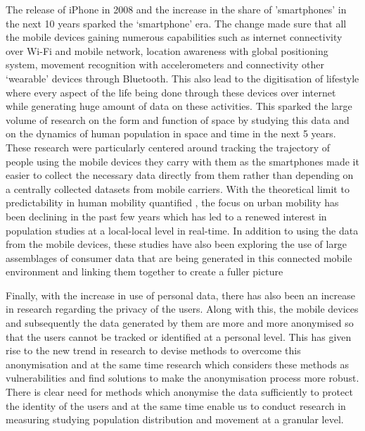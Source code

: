 The release of iPhone in 2008 and the increase in the share of 'smartphones' in the next 10 years sparked the `smartphone' era. 
The change made sure that all the mobile devices gaining numerous capabilities such as internet connectivity over Wi-Fi and mobile network, location awareness with global positioning system, movement recognition with accelerometers and connectivity other `wearable' devices through Bluetooth.
This also lead to the digitisation of lifestyle where every aspect of the life being done through these devices over internet while generating huge amount of data on these activities.
This sparked the large volume of research on the form and function of space by studying this data and on the dynamics of human population in space and time in the next 5 years.
These research were particularly centered around tracking the trajectory of people using the mobile devices they carry with them as the smartphones made it easier to collect the necessary data directly from them rather than depending on a centrally collected datasets from mobile carriers. 
With the theoretical limit to predictability in human mobility quantified \cite{song2010limits}, the focus on urban mobility has been declining in the past few years which has led to a renewed interest in population studies at a local-local level in real-time.
In addition to using the data from the mobile devices, these studies have also been exploring the use of large assemblages of consumer data that are being generated in this connected mobile environment and linking them together to create a fuller picture \cite{cdrc2018}


Finally, with the increase in use of personal data, there has also been an increase in research regarding the privacy of the users.
Along with this, the mobile devices and subsequently the data generated by them are more and more anonymised so that the users cannot be tracked or identified at a personal level.
This has given rise to the new trend in research to devise methods to overcome this anonymisation and at the same time research which considers these methods as vulnerabilities and find solutions to make the anonymisation process more robust. 
There is clear need for methods which anonymise the data sufficiently to protect the identity of the users and at the same time enable us to conduct research in
measuring studying population distribution and movement at a granular level.

